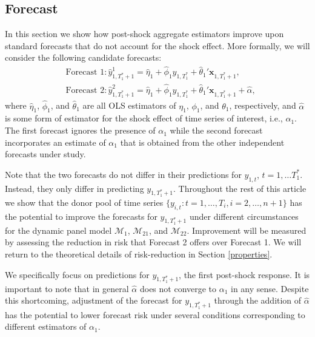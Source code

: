 \documentclass[11pt]{article}
\newcommand{\x}{\textbf{x}}
\def\mc#1{\mathcal{#1}} %
\def\E#1{\mathrm{E}(#1)} %
\theoremstyle{definition}
\begin{document}
\subsection{Forecast}
\label{forecast}
In this section we show how post-shock aggregate estimators improve upon standard 
forecasts that do not account for the shock effect.
More formally, we will consider the following candidate forecasts: 
\begin{align*}
  &\text{Forecast 1}: \hat y_{1,T_1^*+1}^1 = \hat\eta_1 
    + \hat\phi_1 y_{1,T_1^*} + \hat\theta_1'\x_{1,T_1^*+1} 
    , \\
  &\text{Forecast 2}: \hat y_{1,T_1^*+1}^2 = \hat\eta_1 
    + \hat\phi_1 y_{1,T_1^*} + \hat\theta_1'\x_{1,T_1^*+1} 
    + \hat{\alpha},
\end{align*}
where $\hat\eta_1$, $\hat\phi_1$, and $\hat\theta_1$ are all OLS estimators of $\eta_1$, $\phi_1$, and $\theta_1$, respectively, and $\hat{\alpha}$ is some form of estimator for the shock effect of time series of interest, i.e., $\alpha_1$. 
The first forecast ignores the presence of $\alpha_1$ while the second forecast 
incorporates an estimate of $\alpha_1$ that is obtained from the other independent forecasts under study. 

Note that the two forecasts do not differ in their predictions for 
$y_{1,t}$, $t = 1,\ldots T_1^*$. Instead, they only differ in predicting 
$y_{1,T_1^*+1}$. Throughout the rest of this article we show that the donor pool of time series $\{y_{i,t} \colon t = 1,\ldots,T_i, i = 2,\ldots,n+1\}$ has 
the potential to improve the forecasts for $y_{1, T_1^*+1}$ under  different 
circumstances for the dynamic panel model $\mc{M}_1$, $\mc{M}_{21}$, and $\mc{M}_{22}$. Improvement will be measured by assessing the reduction in risk that Forecast 2 offers over Forecast 1. We will return to the theoretical details of risk-reduction in Section \ref{properties}.

We specifically focus on predictions for $y_{1,T_1^*+1}$, the first post-shock response. It is important to note that in general $\hat{\alpha}$ does not converge to $\alpha_1$ in any sense.  Despite this shortcoming, adjustment of the forecast for $y_{1,T_1^*+1}$ through the addition of $\hat{\alpha}$ has the potential to lower forecast risk under several conditions corresponding to different estimators of $\alpha_1$. %
\end{document}
